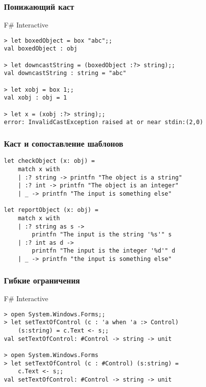\documentclass{../../slides-style}
\begin{document}
    \begin{frame}[fragile]
        \frametitle{Понижающий каст}
        \begin{alertblock}{F\# Interactive}
            \begin{verbatim}
> let boxedObject = box "abc";;
val boxedObject : obj

> let downcastString = (boxedObject :?> string);;
val downcastString : string = "abc"

> let xobj = box 1;;
val xobj : obj = 1

> let x = (xobj :?> string);;
error: InvalidCastException raised at or near stdin:(2,0)
            \end{verbatim}
        \end{alertblock}
    \end{frame}

    \begin{frame}[fragile]
        \frametitle{Каст и сопоставление шаблонов}
        \begin{verbatim}
let checkObject (x: obj) =
    match x with
    | :? string -> printfn "The object is a string"
    | :? int -> printfn "The object is an integer"
    | _ -> printfn "The input is something else"

let reportObject (x: obj) =
    match x with
    | :? string as s -> 
        printfn "The input is the string '%s'" s
    | :? int as d -> 
        printfn "The input is the integer '%d'" d
    | _ -> printfn "the input is something else"
        \end{verbatim}
    \end{frame}

    \begin{frame}[fragile]
        \frametitle{Гибкие ограничения}
        \begin{alertblock}{F\# Interactive}
            \begin{verbatim}
> open System.Windows.Forms;;
> let setTextOfControl (c : 'a when 'a :> Control) 
    (s:string) = c.Text <- s;;
val setTextOfControl: #Control -> string -> unit

> open System.Windows.Forms
> let setTextOfControl (c : #Control) (s:string) = 
    c.Text <- s;;
val setTextOfControl: #Control -> string -> unit
            \end{verbatim}
        \end{alertblock}
    \end{frame}
\end{document}

